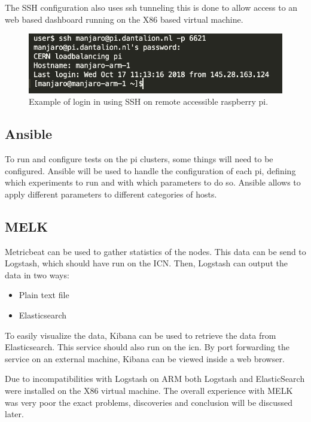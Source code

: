 \documentclass[]{article}
\begin{document}
The SSH configuration also uses ssh tunneling this is done to allow access to an web based dashboard running on the X86 based virtual machine.

\begin{center}
	\begin{figure}[H]
		\includegraphics[width=\textwidth]{ssh}
		\caption{Example of login in using \acrshort{SSH} on remote accessible raspberry pi.}
		\label{fig:ssh}
	\end{figure}
\end{center}


\subsection{Ansible}
To run and configure tests on the pi clusters, some things will need to be configured. Ansible will be used to handle the configuration of each pi, defining which experiments to run and with which parameters to do so. Ansible allows to apply different parameters to different categories of hosts.


\subsection{MELK}
Metricbeat can be used to gather statistics of the nodes. This data can be send to Logstash, which should have run on the ICN. Then, Logstash can output the data in two ways:
\begin{itemize}
	\itemsep 0em
	\item Plain text file
	\item Elasticsearch
\end{itemize}

To easily visualize the data, Kibana can be used to retrieve the data from Elasticsearch. This service should also run on the icn. By port forwarding the service on an external machine, Kibana can be viewed inside a web browser.

Due to incompatibilities with Logstash on ARM both Logstash and ElasticSearch were installed on the X86 virtual machine. The overall experience with MELK was very poor the exact problems, discoveries and conclusion will be discussed later.
\end{document}
